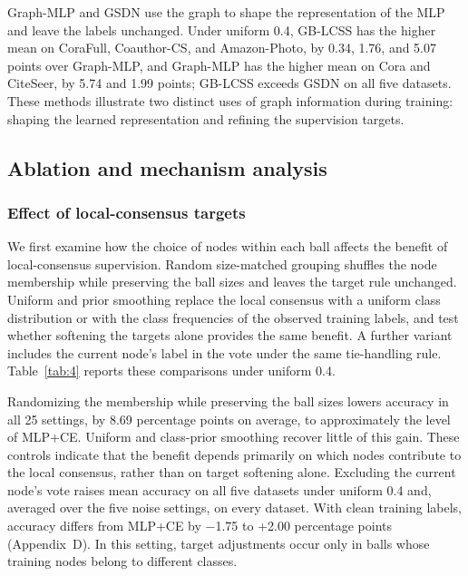 \documentclass[10pt,letterpaper,nopreprintline]{elsarticle}
\theoremstyle{plain}
\begin{document}
Graph-MLP and GSDN use the graph to shape the representation of the MLP and leave the labels unchanged. Under uniform 0.4, GB-LCSS has the higher mean on CoraFull, Coauthor-CS, and Amazon-Photo, by 0.34, 1.76, and 5.07 points over Graph-MLP, and Graph-MLP has the higher mean on Cora and CiteSeer, by 5.74 and 1.99 points; GB-LCSS exceeds GSDN on all five datasets. These methods illustrate two distinct uses of graph information during training: shaping the learned representation and refining the supervision targets.

\subsection{Ablation and mechanism analysis}\label{sec:4.3}

\subsubsection{Effect of local-consensus targets}\label{sec:4.3.1}

We first examine how the choice of nodes within each ball affects the benefit of local-consensus supervision. Random size-matched grouping shuffles the node membership while preserving the ball sizes and leaves the target rule unchanged. Uniform and prior smoothing replace the local consensus with a uniform class distribution or with the class frequencies of the observed training labels, and test whether softening the targets alone provides the same benefit. A further variant includes the current node's label in the vote under the same tie-handling rule. Table~\ref{tab:4} reports these comparisons under uniform 0.4.



Randomizing the membership while preserving the ball sizes lowers accuracy in all 25 settings, by 8.69 percentage points on average, to approximately the level of MLP+CE. Uniform and class-prior smoothing recover little of this gain. These controls indicate that the benefit depends primarily on which nodes contribute to the local consensus, rather than on target softening alone. Excluding the current node's vote raises mean accuracy on all five datasets under uniform 0.4 and, averaged over the five noise settings, on every dataset. With clean training labels, accuracy differs from MLP+CE by \ensuremath{-}1.75 to +2.00 percentage points (Appendix~D). In this setting, target adjustments occur only in balls whose training nodes belong to different classes.
\end{document}
